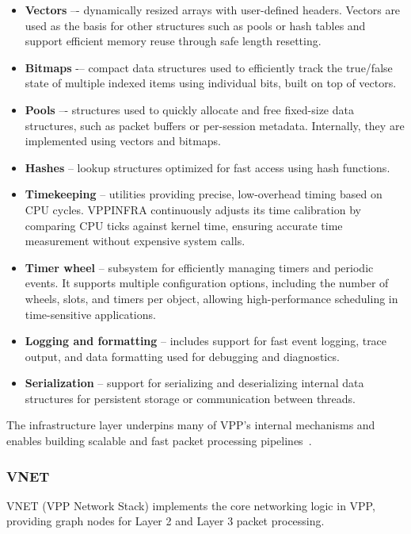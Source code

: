 \begin{itemize}
  \item \textbf{Vectors} –- dynamically resized arrays with user-defined headers. Vectors are used as the basis for other structures such as pools or hash tables and support efficient memory reuse through safe length resetting.

  \item \textbf{Bitmaps} -–  compact data structures used to efficiently track the true/false state of multiple indexed items using individual bits, built on top of vectors.

  \item \textbf{Pools} –- structures used to quickly allocate and free fixed-size data structures, such as packet buffers or per-session metadata. Internally, they are implemented using vectors and bitmaps. 

  \item \textbf{Hashes} -- lookup structures optimized for fast access using hash functions. 

  \item \textbf{Timekeeping} -- utilities providing precise, low-overhead timing based on CPU cycles. VPPINFRA continuously adjusts its time calibration by comparing CPU ticks against kernel time, ensuring accurate time measurement without expensive system calls.

  \item \textbf{Timer wheel} -- subsystem for efficiently managing timers and periodic events. It supports multiple configuration options, including the number of wheels, slots, and timers per object, allowing high-performance scheduling in time-sensitive applications.

  \item \textbf{Logging and formatting} -- includes support for fast event logging, trace output, and data formatting used for debugging and diagnostics.

  \item \textbf{Serialization} -- support for serializing and deserializing internal data structures for persistent storage or communication between threads.
\end{itemize}

The infrastructure layer underpins many of VPP’s internal mechanisms and enables building scalable and fast packet processing pipelines~\cite{fdio-vpp-infrastructure-2506}.

\subsubsection{VNET}
VNET (VPP Network Stack) implements the core networking logic in VPP, providing graph nodes for Layer 2 and Layer 3 packet processing.

